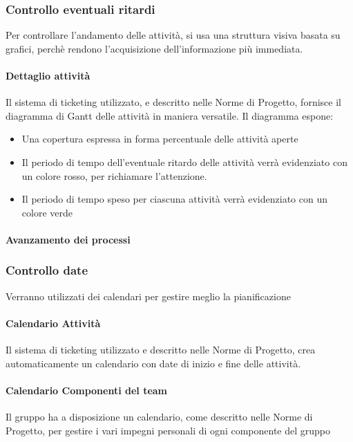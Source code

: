 \subsubsection{Controllo eventuali ritardi}
Per controllare l'andamento delle attività, si usa una struttura visiva basata su grafici, perchè rendono l'acquisizione dell'informazione più immediata.
\paragraph{Dettaglio attività}
Il sistema di ticketing utilizzato, e descritto nelle Norme di Progetto, fornisce il diagramma di Gantt delle attività in maniera versatile. Il diagramma espone:
\begin{itemize}
\item Una copertura espressa in forma percentuale delle attività aperte
\item Il periodo di tempo dell'eventuale ritardo delle attività verrà evidenziato con un colore rosso, per richiamare l'attenzione.
\item Il periodo di tempo speso per ciascuna attività verrà evidenziato con un colore verde
\end{itemize}
\paragraph{Avanzamento dei processi}
\subsubsection{Controllo date}
Verranno utilizzati dei calendari per gestire meglio la pianificazione
\paragraph{Calendario Attività}
Il sistema di ticketing utilizzato e descritto nelle Norme di Progetto, crea automaticamente un calendario con date di inizio e fine delle attività.
\paragraph{Calendario Componenti del team}
Il gruppo ha a disposizione un calendario, come descritto nelle Norme di Progetto, per gestire i vari impegni personali di ogni componente del gruppo
